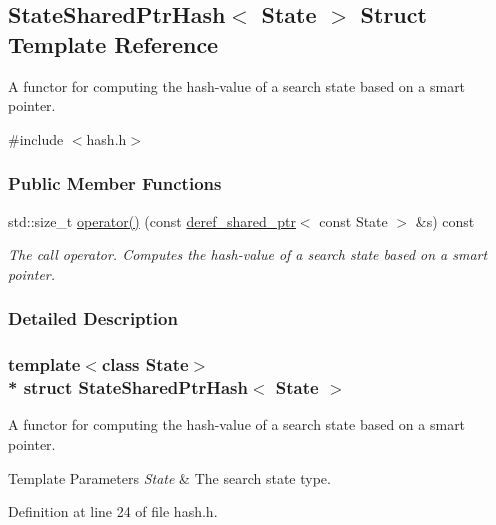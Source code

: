 \hypertarget{structStateSharedPtrHash}{}\subsection{State\+Shared\+Ptr\+Hash$<$ State $>$ Struct Template Reference}
\label{structStateSharedPtrHash}


A functor for computing the hash-\/value of a search state based on a smart pointer.  




{\ttfamily \#include $<$hash.\+h$>$}

\subsubsection*{Public Member Functions}
\begin{DoxyCompactItemize}
\item 
std\+::size\+\_\+t \hyperlink{structStateSharedPtrHash_a9661adbae2847b90ba0bff07f5d17f43}{operator()} (const \hyperlink{classderef__shared__ptr}{deref\+\_\+shared\+\_\+ptr}$<$ const State $>$ \&s) const 
\begin{DoxyCompactList}\small\item\em The call operator. Computes the hash-\/value of a search state based on a smart pointer. \end{DoxyCompactList}\end{DoxyCompactItemize}


\subsubsection{Detailed Description}
\subsubsection*{template$<$class State$>$\\*
struct State\+Shared\+Ptr\+Hash$<$ State $>$}

A functor for computing the hash-\/value of a search state based on a smart pointer. 


\begin{DoxyTemplParams}{Template Parameters}
{\em State} & The search state type. \\
\hline
\end{DoxyTemplParams}


Definition at line 24 of file hash.\+h.



